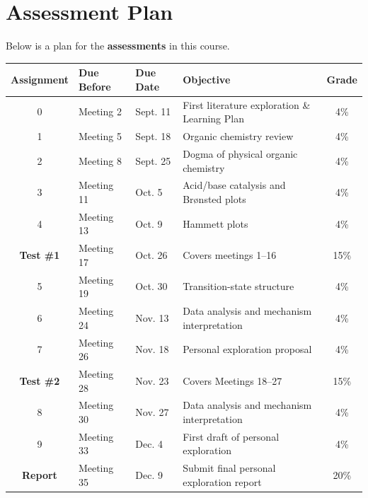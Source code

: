 \section{Assessment Plan}

Below is a plan for the \textbf{assessments} in this course.

\begin{longtable}{cp{2cm}p{2cm}p{7cm}c}
\toprule
Assignment & Due Before & Due Date & Objective & Grade \\
\midrule
0 & Meeting 2 & Sept. 11 & First literature exploration \& Learning Plan & 4\% \\
1 & Meeting 5 & Sept. 18 & Organic chemistry review & 4\% \\
2 & Meeting 8 & Sept. 25 & Dogma of physical organic chemistry & 4\% \\
3 & Meeting 11 & Oct. 5 & Acid/base catalysis and Brønsted plots & 4\% \\
4 & Meeting 13 & Oct. 9 & Hammett plots & 4\% \\
\textbf{Test \#1} & Meeting 17 & Oct. 26 & Covers meetings 1--16 & 15\% \\
5 & Meeting 19 & Oct. 30 & Transition-state structure & 4\% \\
6 & Meeting 24 & Nov. 13 & Data analysis and mechanism interpretation & 4\% \\
7 & Meeting 26 & Nov. 18 & Personal exploration proposal & 4\% \\
\textbf{Test \#2} & Meeting 28 & Nov. 23 & Covers Meetings 18--27 & 15\% \\
8 & Meeting 30 & Nov. 27 & Data analysis and mechanism interpretation & 4\% \\
9 & Meeting 33 & Dec. 4 & First draft of personal exploration & 4\% \\
\textbf{Report} & Meeting 35 & Dec. 9 & Submit final personal exploration report & 20\% \\
\bottomrule
\end{longtable}


